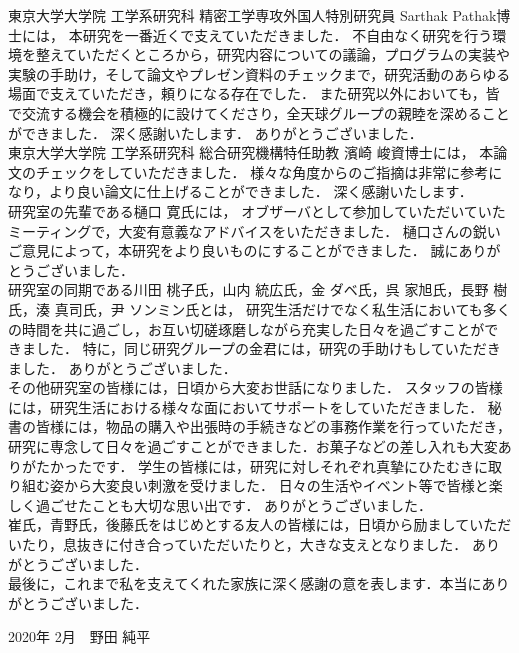 東京大学大学院 工学系研究科 精密工学専攻外国人特別研究員 Sarthak Pathak博士には，
本研究を一番近くで支えていただきました．
不自由なく研究を行う環境を整えていただくところから，研究内容についての議論，プログラムの実装や実験の手助け，そして論文やプレゼン資料のチェックまで，研究活動のあらゆる場面で支えていただき，頼りになる存在でした．
また研究以外においても，皆で交流する機会を積極的に設けてくださり，全天球グループの親睦を深めることができました．
深く感謝いたします．
ありがとうございました．
\\

東京大学大学院 工学系研究科 総合研究機構特任助教 濱崎 峻資博士には，
本論文のチェックをしていただきました．
様々な角度からのご指摘は非常に参考になり，より良い論文に仕上げることができました．
深く感謝いたします．
\\

研究室の先輩である樋口 寛氏には，
オブザーバとして参加していただいていたミーティングで，大変有意義なアドバイスをいただきました．
樋口さんの鋭いご意見によって，本研究をより良いものにすることができました．
誠にありがとうございました．
\\

研究室の同期である川田 桃子氏，山内 統広氏，金 ダベ氏，呉 家旭氏，長野 樹氏，湊 真司氏，尹 ソンミン氏とは，
研究生活だけでなく私生活においても多くの時間を共に過ごし，お互い切磋琢磨しながら充実した日々を過ごすことができました．
特に，同じ研究グループの金君には，研究の手助けもしていただきました．
ありがとうございました．
\\

その他研究室の皆様には，日頃から大変お世話になりました．
スタッフの皆様には，研究生活における様々な面においてサポートをしていただきました．
秘書の皆様には，物品の購入や出張時の手続きなどの事務作業を行っていただき，研究に専念して日々を過ごすことができました．お菓子などの差し入れも大変ありがたかったです．
学生の皆様には，研究に対しそれぞれ真摯にひたむきに取り組む姿から大変良い刺激を受けました．
日々の生活やイベント等で皆様と楽しく過ごせたことも大切な思い出です．
ありがとうございました．
\\

崔氏，青野氏，後藤氏をはじめとする友人の皆様には，日頃から励ましていただいたり，息抜きに付き合っていただいたりと，大きな支えとなりました．
ありがとうございました．
\\

最後に，これまで私を支えてくれた家族に深く感謝の意を表します．本当にありがとうございました．

\begin{flushright}
2020年 2月　野田 純平
\end{flushright}


\newpage


